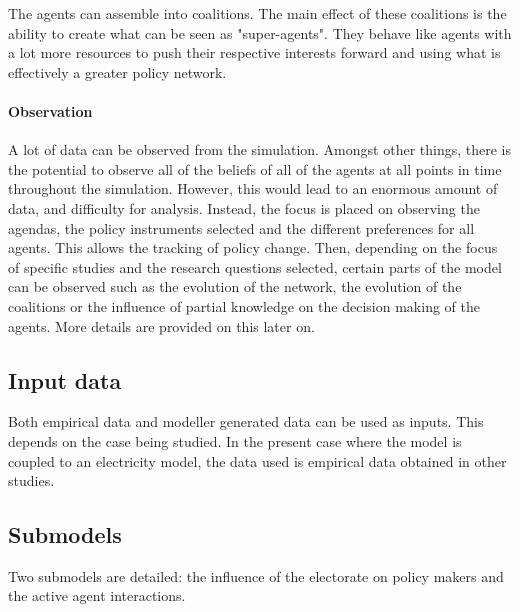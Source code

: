 The agents can assemble into coalitions. The main effect of these coalitions is the ability to create what can be seen as "super-agents". They behave like agents with a lot more resources to push their respective interests forward and using what is effectively a greater policy network.

\paragraph{Observation}

A lot of data can be observed from the simulation. Amongst other things, there is the potential to observe all of the beliefs of all of the agents at all points in time throughout the simulation. However, this would lead to an enormous amount of data, and difficulty for analysis. Instead, the focus is placed on observing the agendas, the policy instruments selected and the different preferences for all agents. This allows the tracking of policy change. Then, depending on the focus of specific studies and the research questions selected, certain parts of the model can be observed such as the evolution of the network, the evolution of the coalitions or the influence of partial knowledge on the decision making of the agents. More details are provided on this later on.


\subsection{Input data}
\label{ssec:inputData}
Both empirical data and modeller generated data can be used as inputs. This depends on the case being studied. In the present case where the model is coupled to an electricity model, the data used is empirical data obtained in other studies.


\subsection{Submodels}
\label{ssec:submodels}

Two submodels are detailed: the influence of the electorate on policy makers and the active agent interactions.


